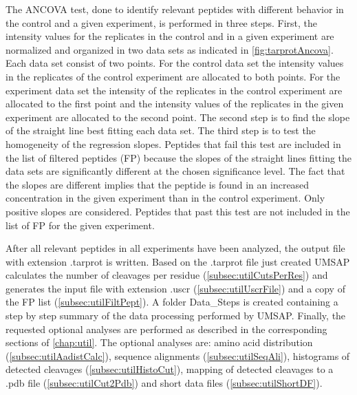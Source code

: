The ANCOVA test, \label{par:tarprotAncovaTest} done to identify relevant peptides with different behavior in the control and a given experiment, is performed in three steps. First, the intensity values for the replicates in the control and in a given experiment are normalized and organized in two data sets as indicated in \autoref{fig:tarprotAncova}. Each data set consist of two points. For the control data set the intensity values in the replicates of the control experiment are allocated to both points. For the experiment data set the intensity of the replicates in the control experiment are allocated to the first point and the intensity values of the replicates in the given experiment are allocated to the second point. The second step is to find the slope of the straight line best fitting each data set. The third step is to test the homogeneity of the regression slopes. Peptides that fail this test are included in the list of filtered peptides (FP) because the slopes of the straight lines fitting the data sets are significantly different at the chosen significance level. The fact that the slopes are different implies that the peptide is found in an increased concentration in the given experiment than in the control experiment. Only positive slopes are considered. Peptides that past this test are not included in the list of FP for the given experiment. 

After all relevant peptides in all experiments have been analyzed, the output file with extension .tarprot is written. Based on the .tarprot file just created UMSAP calculates the number of cleavages per residue (\autoref{subsec:utilCutsPerRes}) and generates the input file with extension .uscr (\autoref{subsec:utilUscrFile}) and a copy of the FP list (\autoref{subsec:utilFiltPept}). A folder Data{\_}Steps is created containing a step by step summary of the data processing performed by UMSAP. Finally, the requested optional analyses are performed as described in the corresponding sections of \autoref{chap:util}. The optional analyses are: amino acid distribution (\autoref{subsec:utilAadistCalc}), sequence alignments (\autoref{subsec:utilSeqAli}), histograms of detected cleavages (\autoref{subsec:utilHistoCut}), mapping of detected cleavages to a .pdb file (\autoref{subsec:utilCut2Pdb}) and short data files (\autoref{subsec:utilShortDF}).

